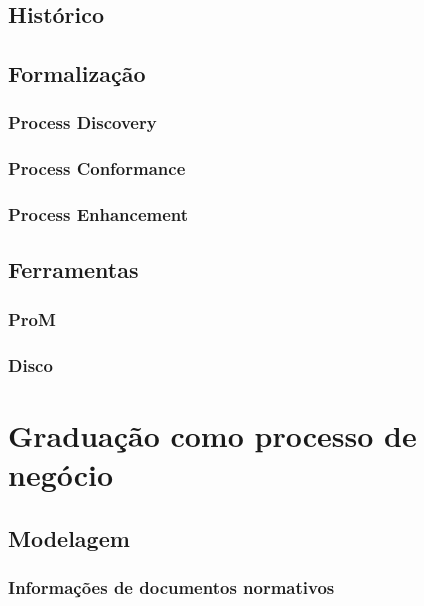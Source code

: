 \documentclass[a4paper]{article}
\begin{document}
\cite{PM_book}

\subsection{Histórico}

\subsection{Formalização}

\subsubsection{Process Discovery}

\subsubsection{Process Conformance}

\subsubsection{Process Enhancement}

\subsection{Ferramentas}

\subsubsection{ProM}

\cite{ProM}

\subsubsection{Disco}

\cite{Disco}

\section{Graduação como processo de negócio}

\subsection{Modelagem}
\subsubsection{Informações de documentos normativos}
\end{document}
